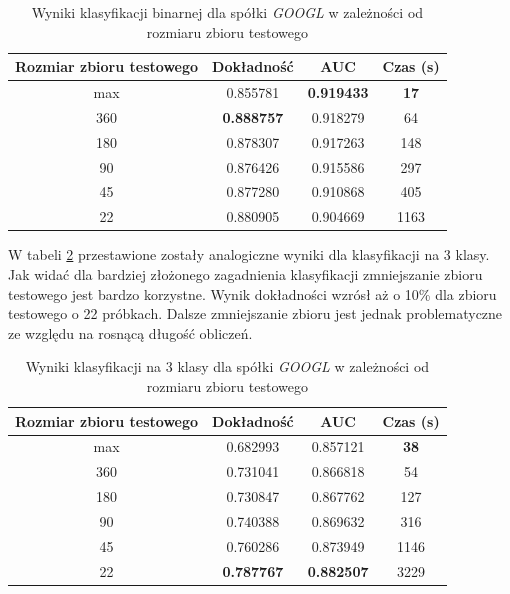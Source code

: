 \documentclass[a4paper, twoside, 11pt, openright]{article}
\begin{document}
\begin{table}[H]
    \centering
    \begin{tabular}{|c|c|c|c|}
    \hline
        \textbf{Rozmiar zbioru testowego} & \textbf{Dokładność} &  \textbf{AUC} &  \textbf{Czas (s)} \\ \hline 
max                           &  0.855781 &  \textbf{0.919433} &   \textbf{17} \\  \hline
360                         &  \textbf{0.888757} &  0.918279 &   64 \\  \hline
180                         &  0.878307 &  0.917263 &  148 \\  \hline
90                          &  0.876426 &  0.915586 &  297 \\ \hline
45                          &  0.877280 &  0.910868 &   405 \\ \hline
22                          &  0.880905 &  0.904669 &  1163 \\ \hline
    \end{tabular}
    \caption{Wyniki klasyfikacji binarnej dla spółki \textit{GOOGL} w zależności od rozmiaru zbioru testowego}
    \label{tab:nn_walk_forward_test_binary}
\end{table}

W tabeli \ref{tab:nn_walk_forward_test_discrete} przestawione zostały analogiczne wyniki dla klasyfikacji na 3 klasy. Jak widać dla bardziej złożonego zagadnienia klasyfikacji zmniejszanie zbioru testowego jest bardzo korzystne. Wynik dokładności wzrósł aż o 10\% dla zbioru testowego o 22 próbkach. Dalsze zmniejszanie zbioru jest jednak problematyczne ze względu na rosnącą długość obliczeń.

\begin{table}[H]
    \centering
    \begin{tabular}{|c|c|c|c|}
    \hline
        \textbf{Rozmiar zbioru testowego} & \textbf{Dokładność} &  \textbf{AUC} &  \textbf{Czas (s)} \\ \hline
max    &  0.682993 &  0.857121 &  \textbf{38} \\ \hline
360     &  0.731041 &  0.866818 &  54 \\ \hline
180   &  0.730847 &  0.867762 &  127 \\ \hline
90   &  0.740388 &  0.869632 &  316 \\ \hline
45     &  0.760286 &  0.873949 &  1146 \\ \hline
22  &  \textbf{0.787767} &  \textbf{0.882507} &  3229 \\ \hline
    \end{tabular}
    \caption{Wyniki klasyfikacji na 3 klasy dla spółki \textit{GOOGL} w zależności od rozmiaru zbioru testowego}
    \label{tab:nn_walk_forward_test_discrete}
\end{table}
\end{document}
